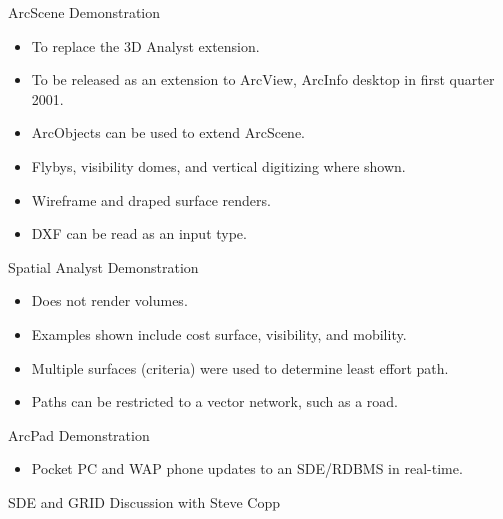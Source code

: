 ArcScene Demonstration

\begin{itemize}
\item To replace the 3D Analyst extension.
\item To be released as an extension to ArcView, ArcInfo desktop in first quarter 2001.
\item ArcObjects can be used to extend ArcScene.
\item Flybys, visibility domes, and vertical digitizing where shown.
\item Wireframe and draped surface renders.
\item DXF can be read as an input type.
\end{itemize}


Spatial Analyst Demonstration

\begin{itemize}
\item Does not render volumes.
\item Examples shown include cost surface, visibility, and mobility.
\item Multiple surfaces (criteria) were used to determine least effort path.
\item Paths can be restricted to a vector network, such as a road.
\end{itemize}


ArcPad Demonstration

\begin{itemize}
\item Pocket PC and WAP phone updates to an SDE/RDBMS in real-time.
\end{itemize}

SDE and GRID Discussion with Steve Copp 

